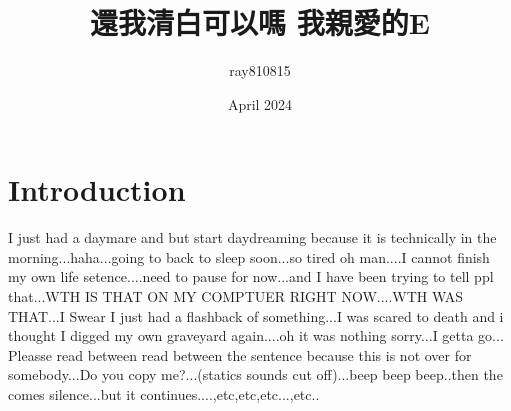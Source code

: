 \documentclass{article}
\title{還我清白可以嗎 我親愛的E}
\author{ray810815 }
\date{April 2024}
\begin{document}
\maketitle

\section{Introduction}
I just had a daymare and but start daydreaming because it is technically in the morning...haha...going to back to sleep soon...so tired oh man....I cannot finish my own life setence....need to pause for now...and I have been trying to tell
ppl that...WTH IS THAT ON MY COMPTUER RIGHT NOW....WTH WAS THAT...I Swear I just had a flashback of something...I was scared to death and i thought I digged my own graveyard  again....oh it was nothing sorry...I getta go...
Pleasse read between read between the sentence because this is not over for somebody...Do you copy me?...(statics sounds cut off)...beep beep beep..then the comes silence...but it continues....,etc,etc,etc...,etc..
\end{document}
